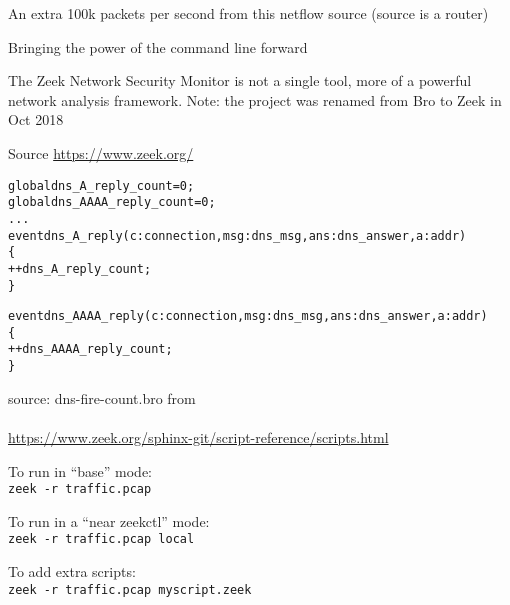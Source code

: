 \documentclass[Screen16to9,17pt]{foils}
\begin{document}


\centerline{An extra 100k packets per second from this netflow source (source is a router)}



\centerline{Bringing the power of the command line forward}






The Zeek Network Security Monitor is not a single tool, more of a
powerful network analysis framework. Note: the project was renamed from Bro to Zeek in Oct 2018

{\small Source \url{https://www.zeek.org/}}


\begin{alltt}\small
global dns_A_reply_count=0;
global dns_AAAA_reply_count=0;
...
event dns_A_reply(c: connection, msg: dns_msg, ans: dns_answer, a: addr)
        \{
        ++dns_A_reply_count;
        \}

event dns_AAAA_reply(c: connection, msg: dns_msg, ans: dns_answer, a: addr)
        \{
        ++dns_AAAA_reply_count;
        \}
\end{alltt}

source: dns-fire-count.bro from\\
{\small {}\\
\url{https://www.zeek.org/sphinx-git/script-reference/scripts.html}}




\begin{list2}
\item To run in “base” mode:\\
 \verb+zeek -r traffic.pcap+
\item To run in a “near zeekctl” mode:\\
\verb+zeek -r traffic.pcap local+
\item To add extra scripts:\\
\verb+zeek -r traffic.pcap myscript.zeek+
\end{list2}
\end{document}
